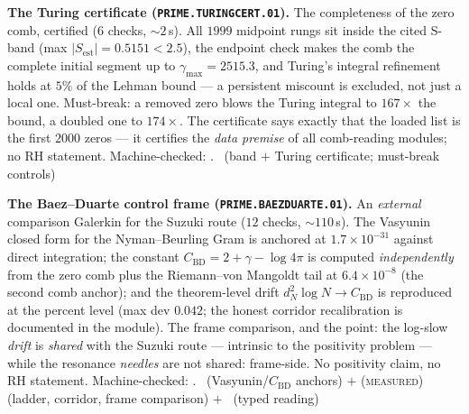 \par\smallskip\noindent\textbf{The Turing certificate
(\texttt{PRIME.TURINGCERT.01}).}
The completeness of the zero comb, certified ($6$ checks,
${\sim}2$\,s).  All $1999$ midpoint rungs sit inside the cited
S-band (max $|S_{\mathrm{est}}|=0.5151<2.5$), the endpoint check
makes the comb the complete initial segment up to
$\gamma_{\max}=2515.3$, and Turing's integral refinement holds at
$5\%$ of the Lehman bound --- a persistent miscount is excluded, not
just a local one.  Must-break: a removed zero blows the Turing
integral to $167\times$ the bound, a doubled one to $174\times$.
The certificate says exactly that the loaded list is the first
$2000$ zeros --- it certifies the \emph{data premise} of all
comb-reading modules; no RH statement.
Machine-checked: .
\mE\ (band $+$ Turing certificate; must-break controls)
\par\smallskip


\par\smallskip\noindent\textbf{The Baez--Duarte control frame
(\texttt{PRIME.BAEZDUARTE.01}).}
An \emph{external} comparison Galerkin for the Suzuki route ($12$
checks, ${\sim}110$\,s).  The Vasyunin closed form for the
Nyman--Beurling Gram is anchored at $1.7\times10^{-31}$ against
direct integration; the constant $C_{\mathrm{BD}}=2+\gamma-\log4\pi$
is computed \emph{independently} from the zero comb plus the
Riemann--von Mangoldt tail at $6.4\times10^{-8}$ (the second comb
anchor); and the theorem-level drift $d_N^2\log N\to
C_{\mathrm{BD}}$ is reproduced at the percent level (max dev
$0.042$; the honest corridor recalibration is documented in the
module).  The frame comparison, and the point: the log-slow
\emph{drift} is \emph{shared} with the Suzuki route --- intrinsic to
the positivity problem --- while the resonance \emph{needles} are
not shared: frame-side.  No positivity claim, no RH statement.
Machine-checked: .
\mE\ (Vasyunin/$C_{\mathrm{BD}}$ anchors) $+$ (\textsc{measured})
(ladder, corridor, frame comparison) $+$ \mC\ (typed reading)
\par\smallskip


